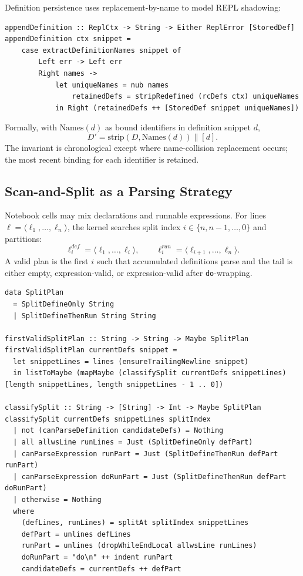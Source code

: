 Definition persistence uses replacement-by-name to model REPL shadowing:

\begin{verbatim}
appendDefinition :: ReplCtx -> String -> Either ReplError [StoredDef]
appendDefinition ctx snippet =
    case extractDefinitionNames snippet of
        Left err -> Left err
        Right names ->
            let uniqueNames = nub names
                retainedDefs = stripRedefined (rcDefs ctx) uniqueNames
            in Right (retainedDefs ++ [StoredDef snippet uniqueNames])
\end{verbatim}

Formally, with $\mathrm{Names}(d)$ as bound identifiers in definition snippet $d$,
$$
D' = \mathrm{strip}(D, \mathrm{Names}(d)) \mathbin{\|} [d].
$$
The invariant is chronological except where name-collision replacement occurs; the most recent binding for each identifier is retained.

\subsection{Scan-and-Split as a Parsing Strategy}

Notebook cells may mix declarations and runnable expressions. For lines
$\ell = \langle \ell_1, \dots, \ell_n \rangle$, the kernel searches split index $i \in \{n, n-1, \dots, 0\}$ and partitions:
$$
\ell^{def}_i = \langle \ell_1, \dots, \ell_i \rangle,
\qquad
\ell^{run}_i = \langle \ell_{i+1}, \dots, \ell_n \rangle.
$$
A valid plan is the first $i$ such that accumulated definitions parse and the tail is either empty, expression-valid, or expression-valid after \verb|do|-wrapping.

\begin{verbatim}
data SplitPlan
  = SplitDefineOnly String
  | SplitDefineThenRun String String

firstValidSplitPlan :: String -> String -> Maybe SplitPlan
firstValidSplitPlan currentDefs snippet =
  let snippetLines = lines (ensureTrailingNewline snippet)
  in listToMaybe (mapMaybe (classifySplit currentDefs snippetLines) [length snippetLines, length snippetLines - 1 .. 0])

classifySplit :: String -> [String] -> Int -> Maybe SplitPlan
classifySplit currentDefs snippetLines splitIndex
  | not (canParseDefinition candidateDefs) = Nothing
  | all allwsLine runLines = Just (SplitDefineOnly defPart)
  | canParseExpression runPart = Just (SplitDefineThenRun defPart runPart)
  | canParseExpression doRunPart = Just (SplitDefineThenRun defPart doRunPart)
  | otherwise = Nothing
  where
    (defLines, runLines) = splitAt splitIndex snippetLines
    defPart = unlines defLines
    runPart = unlines (dropWhileEndLocal allwsLine runLines)
    doRunPart = "do\n" ++ indent runPart
    candidateDefs = currentDefs ++ defPart
\end{verbatim}

